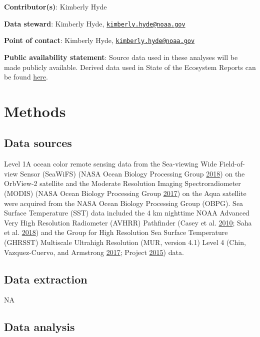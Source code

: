 \documentclass[
]{book}
\begin{document}
\textbf{Contributor(s)}: Kimberly Hyde

\textbf{Data steward}: Kimberly Hyde, \href{mailto:kimberly.hyde@noaa.gov}{\nolinkurl{kimberly.hyde@noaa.gov}}

\textbf{Point of contact}: Kimberly Hyde, \href{mailto:kimberly.hyde@noaa.gov}{\nolinkurl{kimberly.hyde@noaa.gov}}

\textbf{Public availability statement}: Source data used in these analyses will be made publicly available. Derived data used in State of the Ecosystem Reports can be found \href{http://comet.nefsc.noaa.gov/erddap/info/index.html?page=1\&itemsPerPage=1000}{here}.

\hypertarget{methods-8}{%
\section{Methods}\label{methods-8}}

\hypertarget{data-sources-8}{%
\subsection{Data sources}\label{data-sources-8}}

Level 1A ocean color remote sensing data from the Sea-viewing Wide Field-of-view Sensor (SeaWiFS) (NASA Ocean Biology Processing Group \protect\hyperlink{ref-NASA1}{2018}) on the OrbView-2 satellite and the Moderate Resolution Imaging Spectroradiometer (MODIS) (NASA Ocean Biology Processing Group \protect\hyperlink{ref-NASA2}{2017}) on the Aqua satellite were acquired from the NASA Ocean Biology Processing Group (OBPG). Sea Surface Temperature (SST) data included the 4 km nighttime NOAA Advanced Very High Resolution Radiometer (AVHRR) Pathfinder (Casey et al. \protect\hyperlink{ref-Casey2010}{2010}; Saha et al. \protect\hyperlink{ref-Saha2018}{2018}) and the Group for High Resolution Sea Surface Temperature (GHRSST) Multiscale Ultrahigh Resolution (MUR, version 4.1) Level 4 (Chin, Vazquez-Cuervo, and Armstrong \protect\hyperlink{ref-SOE4}{2017}; Project \protect\hyperlink{ref-SOE14}{2015}) data.

\hypertarget{data-extraction-7}{%
\subsection{Data extraction}\label{data-extraction-7}}

NA

\hypertarget{data-analysis-7}{%
\subsection{Data analysis}\label{data-analysis-7}}
\end{document}
